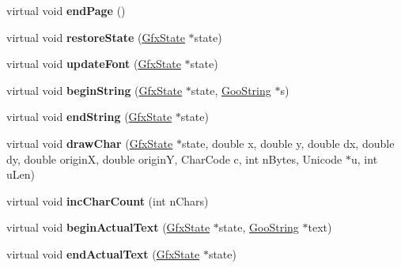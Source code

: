 \begin{DoxyCompactItemize}
\item 
\mbox{\label{class_text_output_dev_a8de8fb6fca6910efbcd8a28e51699adb}} 
virtual void {\bfseries end\+Page} ()
\item 
\mbox{\label{class_text_output_dev_a0c24cdace9542b348cb872b4613e25bf}} 
virtual void {\bfseries restore\+State} (\hyperlink{class_gfx_state}{Gfx\+State} $\ast$state)
\item 
\mbox{\label{class_text_output_dev_ac3470aa17aa8546ee317dc06bea128d6}} 
virtual void {\bfseries update\+Font} (\hyperlink{class_gfx_state}{Gfx\+State} $\ast$state)
\item 
\mbox{\label{class_text_output_dev_af751be94f762b4ad625e425cded18b84}} 
virtual void {\bfseries begin\+String} (\hyperlink{class_gfx_state}{Gfx\+State} $\ast$state, \hyperlink{class_goo_string}{Goo\+String} $\ast$s)
\item 
\mbox{\label{class_text_output_dev_a136533eed4ad1352798363a6d058f65e}} 
virtual void {\bfseries end\+String} (\hyperlink{class_gfx_state}{Gfx\+State} $\ast$state)
\item 
\mbox{\label{class_text_output_dev_a829553461f73a7ebdff0c535626c10cd}} 
virtual void {\bfseries draw\+Char} (\hyperlink{class_gfx_state}{Gfx\+State} $\ast$state, double x, double y, double dx, double dy, double originX, double originY, Char\+Code c, int n\+Bytes, Unicode $\ast$u, int u\+Len)
\item 
\mbox{\label{class_text_output_dev_ad2c7afc56aa1d0d857c656d62de1da18}} 
virtual void {\bfseries inc\+Char\+Count} (int n\+Chars)
\item 
\mbox{\label{class_text_output_dev_af37ba060afa737118fa99fe54ac77893}} 
virtual void {\bfseries begin\+Actual\+Text} (\hyperlink{class_gfx_state}{Gfx\+State} $\ast$state, \hyperlink{class_goo_string}{Goo\+String} $\ast$text)
\item 
\mbox{\label{class_text_output_dev_a363dff0f8129ec03651104d80a75e0ec}} 
virtual void {\bfseries end\+Actual\+Text} (\hyperlink{class_gfx_state}{Gfx\+State} $\ast$state)

\end{DoxyCompactItemize}
